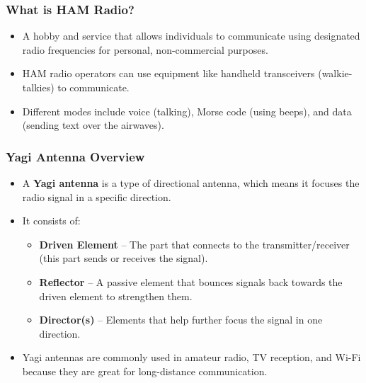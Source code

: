 \documentclass{beamer}
\begin{document}
\begin{frame}
    \frametitle{What is HAM Radio?}
    \begin{itemize}
        \item A hobby and service that allows individuals to communicate using designated radio frequencies for personal, non-commercial purposes.
        \item HAM radio operators can use equipment like handheld transceivers (walkie-talkies) to communicate.
        \item Different modes include voice (talking), Morse code (using beeps), and data (sending text over the airwaves).
    \end{itemize}
\end{frame}

\begin{frame}
    \frametitle{Yagi Antenna Overview}
    \begin{itemize}
        \item A \textbf{Yagi antenna} is a type of directional antenna, which means it focuses the radio signal in a specific direction.
        \item It consists of:
        \begin{itemize}
            \item \textbf{Driven Element} – The part that connects to the transmitter/receiver (this part sends or receives the signal).
            \item \textbf{Reflector} – A passive element that bounces signals back towards the driven element to strengthen them.
            \item \textbf{Director(s)} – Elements that help further focus the signal in one direction.
        \end{itemize}
        \item Yagi antennas are commonly used in amateur radio, TV reception, and Wi-Fi because they are great for long-distance communication.
    \end{itemize}
\end{frame}
\end{document}
